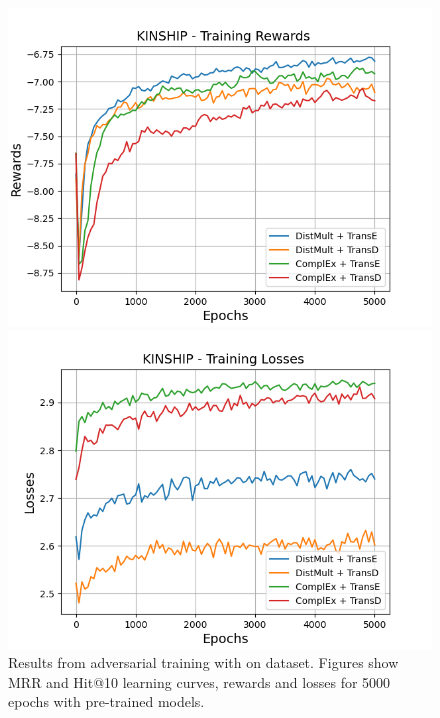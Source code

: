 \begin{figure}[H]
    \begin{minipage}{.5\textwidth}
      \centering
      \includegraphics[width=\linewidth]{figures/results/gan_train/pretrained/random/kinship/random_kinship_rew.png}
    \end{minipage}%
     \begin{minipage}{.5\textwidth}
      \centering
      \includegraphics[width=\linewidth]{figures/results/gan_train/pretrained/random/kinship/random_kinship_losses.png}
    \end{minipage}%
    \caption{Results from adversarial training with \origsampling on \kinship dataset.
    Figures show MRR and Hit@10 learning curves, rewards and losses for 5000 epochs with pre-trained models.}
    \label{fig:gan_train_pretrained_random_kinship}
\end{figure}
